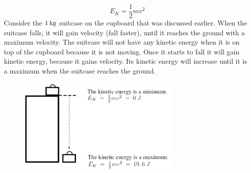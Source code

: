 	\par
      \label{m38785*uid62}\nopagebreak\noindent{}
    \begin{equation}
    {E}_{K}=\frac{1}{2}m{v}^{2}\tag{21.3}
      \end{equation}
      \label{m38785*id66902}Consider the $1\phantom{\rule{2pt}{0ex}}\mathrm{kg}$ suitcase on the cupboard that was discussed earlier. When the suitcase falls, it will gain velocity (fall faster), until it reaches the ground with a maximum velocity. The suitcase will not have any kinetic energy when it is on top of the cupboard because it is not moving. Once it starts to fall it will gain kinetic energy, because it gains velocity. Its kinetic energy will increase until it is a maximum when the suitcase reaches the ground.\par 
      \label{m38785*id66909}
    \setcounter{subfigure}{0}
	\begin{figure}[H] %
    \begin{center}
    \label{m38785*id66912!!!underscore!!!media}\label{m38785*id66912!!!underscore!!!printimage}\includegraphics[width=300px]{col11305.imgs/m38785_PG10C3_008.png} %
      \vspace{2pt}
    \vspace{.1in}
    \end{center}
 \end{figure}       
      \par 
\label{m38785*secfhsst!!!underscore!!!id1079}\vspace{.5cm} 
      \noindent
